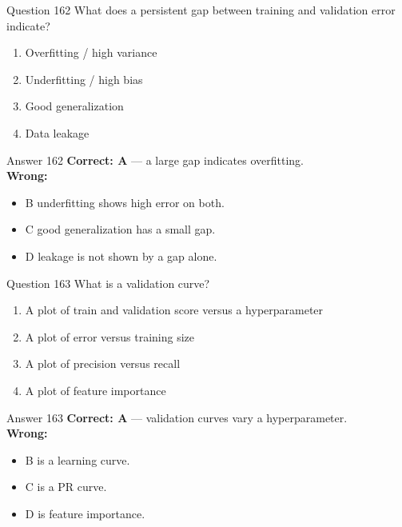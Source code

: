 \documentclass[aspectratio=169,11pt]{beamer}
\begin{document}
	\begin{frame}{Question 162}
		What does a persistent gap between training and validation error indicate?
		\begin{enumerate}[label=\Alph*.]
			\item Overfitting / high variance
			\item Underfitting / high bias
			\item Good generalization
			\item Data leakage
		\end{enumerate}
	\end{frame}
	\begin{frame}{Answer 162}
		\textbf{Correct: A} --- a large gap indicates overfitting.\\
		\vspace{0.5em}
		\textbf{Wrong:}
		\begin{itemize}
			\item B underfitting shows high error on both.
			\item C good generalization has a small gap.
			\item D leakage is not shown by a gap alone.
		\end{itemize}
	\end{frame}
	
	\begin{frame}{Question 163}
		What is a validation curve?
		\begin{enumerate}[label=\Alph*.]
			\item A plot of train and validation score versus a hyperparameter
			\item A plot of error versus training size
			\item A plot of precision versus recall
			\item A plot of feature importance
		\end{enumerate}
	\end{frame}
	\begin{frame}{Answer 163}
		\textbf{Correct: A} --- validation curves vary a hyperparameter.\\
		\vspace{0.5em}
		\textbf{Wrong:}
		\begin{itemize}
			\item B is a learning curve.
			\item C is a PR curve.
			\item D is feature importance.
		\end{itemize}
	\end{frame}
	
\end{document}
